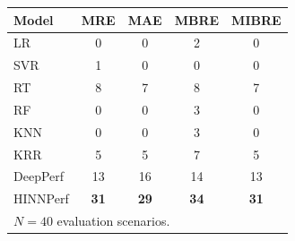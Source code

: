 \begin{tabular}{lcccc}
\toprule
Model & MRE & MAE & MBRE & MIBRE \\
\midrule
LR & 0 & 0 & 2 & 0 \\
SVR & 1 & 0 & 0 & 0 \\
RT & 8 & 7 & 8 & 7 \\
RF & 0 & 0 & 3 & 0 \\
KNN & 0 & 0 & 3 & 0 \\
KRR & 5 & 5 & 7 & 5 \\
DeepPerf & 13 & 16 & 14 & 13 \\
HINNPerf & \textbf{31} & \textbf{29} & \textbf{34} & \textbf{31} \\
\midrule
\multicolumn{5}{l}{\footnotesize $N=40$ evaluation scenarios.} \\
\bottomrule
\end{tabular}

